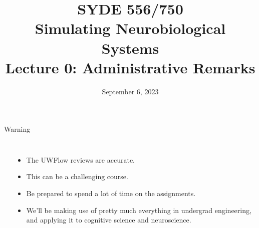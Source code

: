\documentclass[aspectratio=169]{beamer}
\date{September 6, 2023}
\title{SYDE 556/750 \\ Simulating Neurobiological Systems \\ Lecture 0: Administrative Remarks}
\begin{document}
	
\begin{frame}{}
	\MakeTitle
\end{frame}

\begin{frame}{Warning}
	\begin{columns}[T]
		\fboxrule=0.4pt\fboxsep=0pt\\
		\begin{itemize}
			\item The UWFlow reviews are accurate. 
			\item This can be a challenging course.
			\item Be prepared to spend a lot of time on the assignments.
			\item We'll be making use of pretty much everything in undergrad engineering,
			      and applying it to cognitive science and neuroscience.
		\end{itemize}
	\end{columns}
\end{frame}
\end{document}
